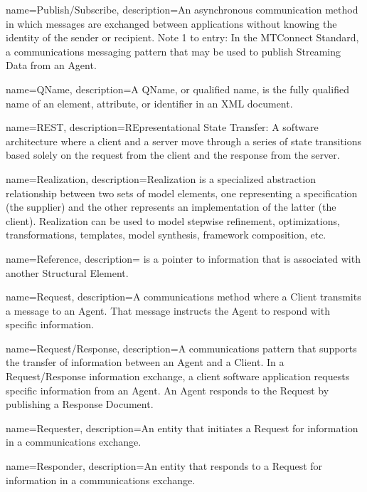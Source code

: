 {
    name={Publish/Subscribe},
	description={An asynchronous communication method in which messages are exchanged between applications without knowing the identity of the sender or recipient.
Note 1 to entry: In the MTConnect Standard, a communications messaging pattern that may be used to publish \gls{Streaming Data} from an \gls{Agent}. }
}

{
    name={QName},
	description={A \gls{QName}, or qualified name, is the fully qualified name of an element, attribute, or identifier in an XML document.}
}

{
    name={REST},
	description={REpresentational State Transfer:  A software architecture where a client and a server move through a series of state transitions based solely on the request from the client and the response from the server. 
}
}

{
    name={Realization},
	description={Realization is a specialized abstraction relationship between two sets of model elements, one representing a specification (the supplier) and the other represents an implementation of the latter (the client). Realization can be used to model stepwise refinement, optimizations, transformations, templates, model synthesis, framework composition, etc.}
}

{
    name={Reference},
	description={ is a pointer to information that is associated with another \gls{Structural Element}.}
}

{
    name={Request},
	description={A communications method where a \gls{Client} transmits a message to an \gls{Agent}.  That message instructs the \gls{Agent} to respond with specific information.}
}

{
    name={Request/Response},
	description={A communications pattern that supports the transfer of information between an \gls{Agent} and a \gls{Client}. 
In a \gls{Request/Response} information exchange, a client software application requests specific information from an \gls{Agent}. An \gls{Agent} responds to the \gls{Request} by publishing a \gls{Response Document}. }
}

{
    name={Requester},
	description={An entity that initiates a \gls{Request} for information in a communications exchange.}
}

{
    name={Responder},
	description={An entity that responds to a \gls{Request} for information in a communications exchange.}
}

